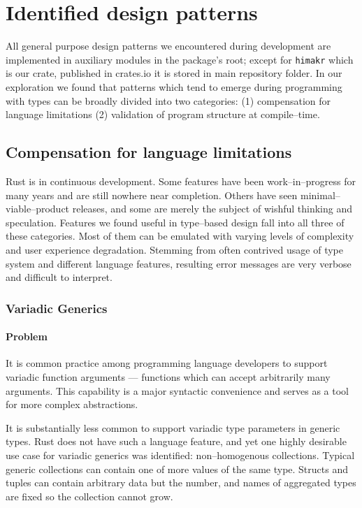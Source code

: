 \section{Identified design patterns}

All general purpose design patterns we encountered during development are implemented in auxiliary modules in the package's root; 
except for \texttt{himakr} which is our crate, published in crates.io it is stored in main repository folder.
In our exploration we found that patterns which tend to emerge during programming with types can be broadly divided into two categories: (1) compensation for language limitations (2) validation of program structure at compile--time.

\subsection{Compensation for language limitations}

Rust is in continuous development. 
Some features have been work--in--progress for many years and are still nowhere near completion. 
Others have seen minimal--viable--product releases, and some are merely the subject of wishful thinking and speculation. 
Features we found useful in type--based design fall into all three of these categories.
Most of them can be emulated with varying levels of complexity and user experience degradation.
Stemming from often contrived usage of type system and different language features,
resulting error messages are very verbose and difficult to interpret.

\subsubsection{Variadic Generics}

\paragraph{Problem}

It is common practice among programming language developers to support variadic function arguments --- functions which can accept arbitrarily many arguments.
This capability is a major syntactic convenience and serves as a tool for more complex abstractions.

It is substantially less common to support variadic type parameters in generic types. Rust does not have such a language feature,
and yet one highly desirable use case for variadic generics was identified: non--homogenous collections. 
Typical generic collections can contain one of more values of the same type.
Structs and tuples can contain arbitrary data but the number, and names of aggregated types are fixed so the collection cannot grow.

